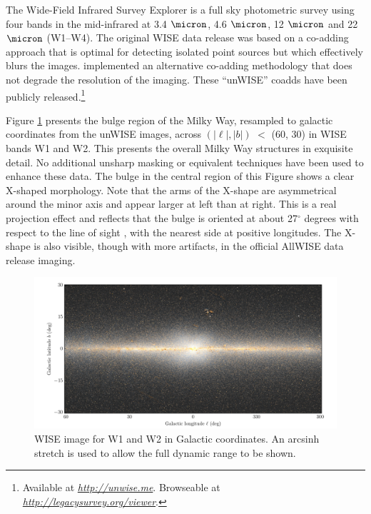 \documentclass[12pt, preprint]{aastex}
\newcommand{\niceurl}[1]{\href{#1}{\textsl{#1}}}
\newcommand{\viewerurl}{\niceurl{http://legacysurvey.org/viewer}}
\begin{document}
The Wide-Field Infrared Survey Explorer \citep[WISE;][]{W2010} is a full sky photometric survey using four bands in the mid-infrared at 3.4 $\micron$, 4.6 $\micron$, 12 $\micron$ and 22 $\micron$ (W1--W4). The original WISE data release was based on a co-adding approach that is optimal for detecting isolated point sources but which effectively blurs the images. \citet{Lang2014a} implemented an alternative co-adding methodology that does not degrade the resolution of the imaging.  These ``unWISE'' coadds have been publicly released.\footnote{Available at \niceurl{http://unwise.me}. Browseable at \viewerurl.}

Figure \ref{fig:xbulge} presents the bulge region of the Milky Way,  resampled to galactic coordinates from the unWISE images, across $(|\ell|,|b|)$ $<$ (60, 30) in WISE bands W1 and W2.  This presents the overall Milky Way structures in exquisite detail.
No additional unsharp masking or equivalent techniques have been used to enhance these data. The bulge in the central region of this Figure shows a clear X-shaped morphology. Note that the arms of the X-shape are asymmetrical around the minor axis and appear larger at left than at right. This is a real projection effect and reflects that the bulge is oriented at about 27$^\circ$ degrees with respect to the line of sight \citep{Wegg2013}, with the nearest side at positive longitudes. The X-shape is also visible, though with more artifacts, in the official AllWISE data release imaging.


\begin{figure}[h!]
\centering
        \includegraphics[width=\textwidth]{xbulge-00}
\caption{WISE image for W1 and W2 in Galactic coordinates.  An arcsinh
  stretch is used to allow the full dynamic range to be shown.}
\label{fig:xbulge}
\end{figure}
\end{document}
